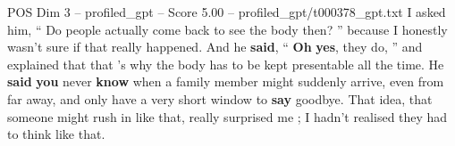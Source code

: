 \begin{textsample}{POS Dim 3 – profiled\_gpt – Score 5.00 – profiled\_gpt/t000378\_gpt.txt}  \label{ex:f3_pos_026}
I asked him, “ Do people actually come back to see the body then? ” because I honestly wasn't sure if that really happened.
And he \textbf{said}, “ \textbf{Oh} \textbf{yes}, they do, ” and explained that that ’s why the body has to be kept presentable all the time.
He \textbf{said} \textbf{you} never \textbf{know} when a family member might suddenly arrive, even from far away, and only have a very short window to \textbf{say} goodbye.
That idea, that someone might rush in like that, really surprised me ; I hadn't realised they had to think like that.

\end{textsample}
